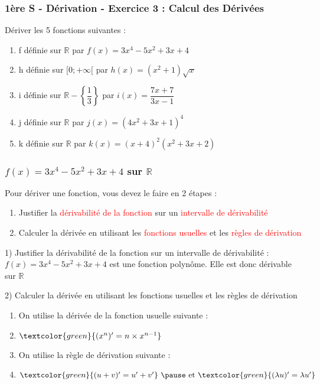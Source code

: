 \documentclass[t]{beamer}
\begin{document}
\begin{frame}
\frametitle{1ère S - Dérivation - Exercice 3 : Calcul des Dérivées}
Dériver les 5 fonctions suivantes :
\begin{enumerate}
\item f définie sur $\mathbb{R}$ par $f(x) = 3x^4 - 5x^2 + 3x + 4 $
\item h définie sur $[0;+\infty[$ par $h(x) = (x^2+1)\sqrt{x} $
\item i définie sur $\mathbb{R} - \left\lbrace  \dfrac{1}{3} \right\rbrace $ par $i(x) = \dfrac{7x+7}{3x-1} $
\item j définie sur $\mathbb{R}$ par $j(x) = (4x^2+3x+1)^4$
\item k définie sur $\mathbb{R}$ par $k(x) = (x+4)^2 (x^2+3x+2) $
\end{enumerate}
\end{frame}

\begin{frame}
\frametitle{$f(x) = 3x^4 - 5x^2 + 3x + 4 $ sur $\mathbb{R}$}
\pause
Pour dériver une fonction, vous devez le faire en 2 étapes : 
\pause
\begin{enumerate}
\item Justifier la \textcolor{red}{dérivabilité de la fonction} \pause sur un \textcolor{red}{intervalle de dérivabilité}
\pause
\item Calculer la dérivée en utilisant les \textcolor{red}{fonctions usuelles} \pause et les \textcolor{red}{règles de dérivation}
\pause
\end{enumerate}

\begin{block}{1) Justifier la dérivabilité de la fonction sur un intervalle de dérivabilité :}
\pause
$f(x) = 3x^4 - 5x^2 + 3x + 4$ est une fonction polynôme. \pause Elle est donc dérivable sur $\mathbb{R}$
\pause
\end{block}

\begin{block}{2) Calculer la dérivée en utilisant les fonctions usuelles et les règles de dérivation}
\pause
\begin{enumerate}[]
\item On utilise la dérivée de la fonction usuelle suivante :
\pause
\item \(\textcolor{green}{ (x^n)' = n \times x^{n-1} }\)
\pause
\item On utilise la règle de dérivation suivante :
\pause
\item \(\textcolor{green}{(u+v)' = u' + v'}$ \pause et $\textcolor{green}{ (\lambda u)' = \lambda u'}\)
\pause
\end{enumerate}
\end{block}
\end{frame}
\end{document}
